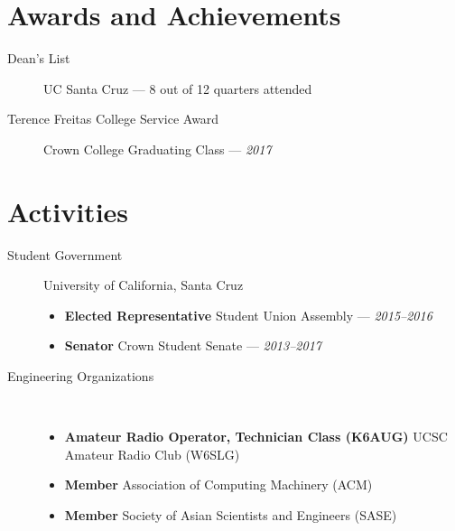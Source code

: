 \documentclass[10pt]{article}
\begin{document}
\section*{Awards and Achievements}
\begin{description}
  \item[Dean's List] UC Santa Cruz --- 8 out of 12 quarters attended
  \item[Terence Freitas College Service Award] Crown College Graduating Class --- \textit{2017}
\end{description}

\section*{Activities}
\begin{description}
  \item[Student Government] University of California, Santa Cruz
    \begin{itemize}
      \item \textbf{Elected Representative} Student Union Assembly --- \textit{2015--2016}
      \item \textbf{Senator} Crown Student Senate --- \textit{2013--2017}
    \end{itemize}
  \item[Engineering Organizations] ~
    \begin{itemize}
      \item \textbf{Amateur Radio Operator, Technician Class (K6AUG)} UCSC Amateur Radio Club (W6SLG)
      \item \textbf{Member} Association of Computing Machinery (ACM)
      \item \textbf{Member} Society of Asian Scientists and Engineers (SASE)
    \end{itemize}
\end{description}
\begin{comment}
  \item[Volunteering] ~
  \begin{itemize}
  \item \textbf{Marketing Communications Chairperson} San Francisco
  Fil-Am Lions Club --- \textit{2015-current}
  \item \textbf{Associate Member} Silicon Valley Cyber Lions Club ---
  \textit{2016--current}
  \end{itemize}
\end{comment}
\end{document}
